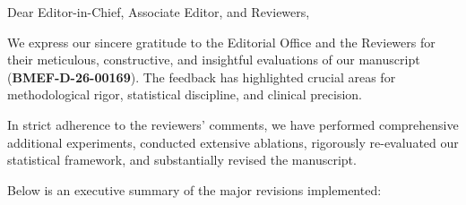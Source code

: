 
Dear Editor-in-Chief, Associate Editor, and Reviewers,

We express our sincere gratitude to the Editorial Office and the Reviewers for their meticulous, constructive, and insightful evaluations of our manuscript (\textbf{BMEF-D-26-00169}). The feedback has highlighted crucial areas for methodological rigor, statistical discipline, and clinical precision. 

In strict adherence to the reviewers' comments, we have performed comprehensive additional experiments, conducted extensive ablations, rigorously re-evaluated our statistical framework, and substantially revised the manuscript. 

Below is an executive summary of the major revisions implemented:

